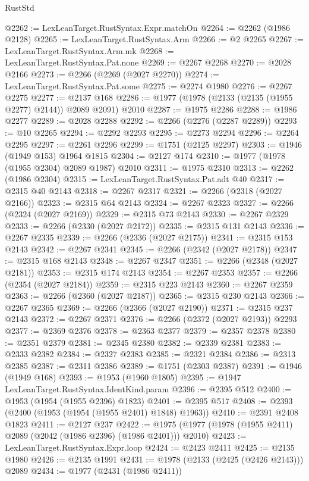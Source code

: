 \begin{lexlean}{RustStd}
\begin{coremodule}
@2262 := LexLeanTarget.RustSyntax.Expr.matchOn
@2264 := @2262 (@1986 @2128)
@2265 := LexLeanTarget.RustSyntax.Arm
@2266 := @2 @2265
@2267 := LexLeanTarget.RustSyntax.Arm.mk
@2268 := LexLeanTarget.RustSyntax.Pat.none
@2269 := @2267 @2268
@2270 := @2028 @2166
@2273 := @2266 (@2269 (@2027 @2270))
@2274 := LexLeanTarget.RustSyntax.Pat.some
@2275 := @2274 @1980
@2276 := @2267 @2275
@2277 := @2137 @168
@2286 := @1977 (@1978 (@2133 (@2135 (@1955 @2277) @2144)) @2089 @2091) @2010
@2287 := @1975 @2286
@2288 := @1986 @2277
@2289 := @2028 @2288
@2292 := @2266 (@2276 (@2287 @2289))
@2293 := @10 @2265
@2294 := @2292 @2293
@2295 := @2273 @2294
@2296 := @2264 @2295
@2297 := @2261 @2296
@2299 := @1751 (@2125 @2297)
@2303 := @1946 (@1949 @153) @1964 @1815
@2304 := @2127 @174
@2310 := @1977 (@1978 (@1955 @2304) @2089 @1987) @2010
@2311 := @1975 @2310
@2313 := @2262 (@1986 @2304)
@2315 := LexLeanTarget.RustSyntax.Pat.adt @40
@2317 := @2315 @40 @2143
@2318 := @2267 @2317
@2321 := @2266 (@2318 (@2027 @2166))
@2323 := @2315 @64 @2143
@2324 := @2267 @2323
@2327 := @2266 (@2324 (@2027 @2169))
@2329 := @2315 @73 @2143
@2330 := @2267 @2329
@2333 := @2266 (@2330 (@2027 @2172))
@2335 := @2315 @131 @2143
@2336 := @2267 @2335
@2339 := @2266 (@2336 (@2027 @2175))
@2341 := @2315 @153 @2143
@2342 := @2267 @2341
@2345 := @2266 (@2342 (@2027 @2178))
@2347 := @2315 @168 @2143
@2348 := @2267 @2347
@2351 := @2266 (@2348 (@2027 @2181))
@2353 := @2315 @174 @2143
@2354 := @2267 @2353
@2357 := @2266 (@2354 (@2027 @2184))
@2359 := @2315 @223 @2143
@2360 := @2267 @2359
@2363 := @2266 (@2360 (@2027 @2187))
@2365 := @2315 @230 @2143
@2366 := @2267 @2365
@2369 := @2266 (@2366 (@2027 @2190))
@2371 := @2315 @237 @2143
@2372 := @2267 @2371
@2376 := @2266 (@2372 (@2027 @2193)) @2293
@2377 := @2369 @2376
@2378 := @2363 @2377
@2379 := @2357 @2378
@2380 := @2351 @2379
@2381 := @2345 @2380
@2382 := @2339 @2381
@2383 := @2333 @2382
@2384 := @2327 @2383
@2385 := @2321 @2384
@2386 := @2313 @2385
@2387 := @2311 @2386
@2389 := @1751 (@2303 @2387)
@2391 := @1946 (@1949 @168)
@2393 := @1953 (@1960 @1805)
@2395 := @1947 LexLeanTarget.RustSyntax.IdentKind.param
@2396 := @2395 @512
@2400 := @1953 (@1954 (@1955 @2396) @1823)
@2401 := @2395 @517
@2408 := @2393 (@2400 (@1953 (@1954 (@1955 @2401) @1848) @1963))
@2410 := @2391 @2408 @1823
@2411 := @2127 @237
@2422 := @1975 (@1977 (@1978 (@1955 @2411) @2089 (@2042 (@1986 @2396) (@1986 @2401))) @2010)
@2423 := LexLeanTarget.RustSyntax.Expr.loop
@2424 := @2423 @2411
@2425 := @2135 @1980
@2426 := @2135 @1991
@2431 := @1978 (@2133 (@2425 (@2426 @2143))) @2089
@2434 := @1977 (@2431 (@1986 @2411))

\end{coremodule}
\end{lexlean}
